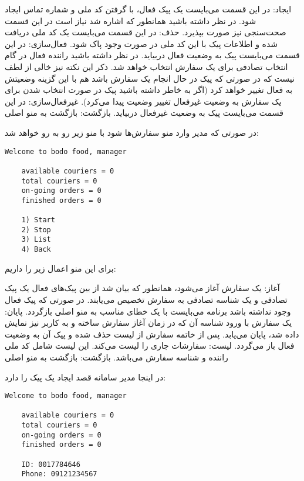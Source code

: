 \documentclass[../main.tex]{subfiles}
\begin{document}
 ایجاد: در این قسمت می‌بایست یک پیک فعال، با گرفتن کد ملی و شماره تماس ایجاد شود. در نظر داشته باشید همانطور که اشاره شد نیاز است در این قسمت صحت‌سنجی نیز صورت بپذیرد.
 حذف:‌ در این قسمت می‌بایست یک کد ملی دریافت شده و اطلاعات پیک با این کد ملی در صورت وجود پاک شود.
 فعال‌سازی: در این قسمت می‌بایست پیک به وضعیت فعال دربیاید. در نظر داشته باشید راننده فعال در گام انتخاب تصادفی برای یک سفارش انتخاب خواهد شد. ذکر این نکته نیز خالی از لطف نیست که در صورتی که پیک در حال انجام یک سفارش باشد هم با این گزینه وضعیتش به فعال تغییر خواهد کرد (اگر به خاطر داشته باشید پیک در صورت انتخاب شدن برای یک سفارش به وضعیت غیرفعال تغییر وضعیت پیدا می‌کرد).
 غیرفعال‌سازی:‌ در این قسمت می‌بایست پیک به وضعیت غیرفعال دربیاید.
 بازگشت: بازگشت به منو اصلی

در صورتی که مدیر وارد منو سفارش‌ها شود با منو زیر رو به رو خواهد شد:

\begin{latin}
\begin{lstlisting}[]
    Welcome to bodo food, manager

    available couriers = 0
    total couriers = 0
    on-going orders = 0
    finished orders = 0

    1) Start
    2) Stop
    3) List
    4) Back
\end{lstlisting}
\end{latin}

برای این منو اعمال زیر را داریم:

 آغاز: یک سفارش آغاز می‌شود، همانطور که بیان شد از بین پیک‌های فعال یک پیک تصادفی و یک شناسه تصادفی به سفارش تخصیص می‌یابند. در صورتی که پیک فعال وجود نداشته باشد برنامه می‌بایست با یک خطای مناسب به منو اصلی بازگردد.
 پایان: یک سفارش با ورود شناسه آن که در زمان آغاز سفارش ساخته و به کاربر نیز نمایش داده شد، پایان می‌یابد. پس از خاتمه سفارش از لیست حذف شده و پیک آن به وضعیت فعال باز می‌گردد.
 لیست:‌ سفارشات جاری را لیست می‌کند. این لیست شامل کد ملی راننده و شناسه سفارش می‌باشد.
 بازگشت: بازگشت به منو اصلی

در اینجا مدیر سامانه قصد ایجاد یک پیک را دارد:

\begin{latin}
\begin{lstlisting}[]
    Welcome to bodo food, manager

    available couriers = 0
    total couriers = 0
    on-going orders = 0
    finished orders = 0

    ID: 0017784646
    Phone: 09121234567
\end{lstlisting}
\end{latin}
\end{document}
